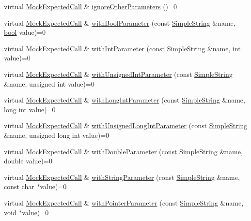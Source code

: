 \begin{DoxyCompactItemize}
\item 
virtual \hyperlink{class_mock_expected_call}{Mock\+Expected\+Call} \& \hyperlink{class_mock_expected_call_a849491ac2263841377204edc1780aff1}{ignore\+Other\+Parameters} ()=0
\item 
virtual \hyperlink{class_mock_expected_call}{Mock\+Expected\+Call} \& \hyperlink{class_mock_expected_call_a6863a4109e609a7276dc2abdea6b8a74}{with\+Bool\+Parameter} (const \hyperlink{class_simple_string}{Simple\+String} \&name, \hyperlink{avb__gptp_8h_af6a258d8f3ee5206d682d799316314b1}{bool} value)=0
\item 
virtual \hyperlink{class_mock_expected_call}{Mock\+Expected\+Call} \& \hyperlink{class_mock_expected_call_a721c7a2bc4442fb0e4fc265fe09648f9}{with\+Int\+Parameter} (const \hyperlink{class_simple_string}{Simple\+String} \&name, int value)=0
\item 
virtual \hyperlink{class_mock_expected_call}{Mock\+Expected\+Call} \& \hyperlink{class_mock_expected_call_ac935bc429aca0ae0175756d82ddec700}{with\+Unsigned\+Int\+Parameter} (const \hyperlink{class_simple_string}{Simple\+String} \&name, unsigned int value)=0
\item 
virtual \hyperlink{class_mock_expected_call}{Mock\+Expected\+Call} \& \hyperlink{class_mock_expected_call_a1cece3ad2ae833801e166aa6f8b4aeda}{with\+Long\+Int\+Parameter} (const \hyperlink{class_simple_string}{Simple\+String} \&name, long int value)=0
\item 
virtual \hyperlink{class_mock_expected_call}{Mock\+Expected\+Call} \& \hyperlink{class_mock_expected_call_ad8500b86dca8d973cd0ef5089cc9e26c}{with\+Unsigned\+Long\+Int\+Parameter} (const \hyperlink{class_simple_string}{Simple\+String} \&name, unsigned long int value)=0
\item 
virtual \hyperlink{class_mock_expected_call}{Mock\+Expected\+Call} \& \hyperlink{class_mock_expected_call_affffe79b35f85c05ed2c48af1165c3e4}{with\+Double\+Parameter} (const \hyperlink{class_simple_string}{Simple\+String} \&name, double value)=0
\item 
virtual \hyperlink{class_mock_expected_call}{Mock\+Expected\+Call} \& \hyperlink{class_mock_expected_call_acdbc3ffa1fc96fc1b02d20574c71736f}{with\+String\+Parameter} (const \hyperlink{class_simple_string}{Simple\+String} \&name, const char $\ast$value)=0
\item 
virtual \hyperlink{class_mock_expected_call}{Mock\+Expected\+Call} \& \hyperlink{class_mock_expected_call_ae46491491eae82eeb8b1722b5e9c85ab}{with\+Pointer\+Parameter} (const \hyperlink{class_simple_string}{Simple\+String} \&name, void $\ast$value)=0

\end{DoxyCompactItemize}
